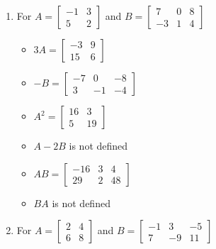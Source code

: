 \begin{enumerate}
\begin{multicols}{3}
\begin{itemize}
\end{itemize}
\end{multicols}

\item For  $A = \left[ \begin{array}{rr} -1 & 3 \\ 5 & 2 \end{array} \right]$ and
 $B=\left[ \begin{array}{rrr} 7 & 0 & 8 \\ -3 & 1 & 4 \end{array} \right]$
 
\begin{multicols}{3}
\begin{itemize}
\item  $3A = \left[ \begin{array}{rr} -3 & 9 \\ 15 & 6\end{array} \right]$

\item $-B = \left[ \begin{array}{rrr} -7 & 0 & -8 \\ 3 & -1 & -4 \end{array} \right]$

\item $A^2 = \left[ \begin{array}{rr} 16 & 3 \\ 5 & 19 \end{array} \right]$

\end{itemize}
\end{multicols}


\begin{multicols}{3}
\begin{itemize}
\item  $A-2B$ is not defined

\item $AB = \left[ \begin{array}{rrr} -16 & 3 & 4 \\ 29 & 2 & 48 \end{array} \right]$

\item $BA$ is not defined

\end{itemize}
\end{multicols}

\item For  $A = \left[ \begin{array}{rr} 2 & 4 \\ 6 & 8 \end{array} \right]$ and $B=\left[ \begin{array}{rrr} -1 & 3 & -5 \\ 7 & -9 & 11 \end{array} \right]$


\end{enumerate}
